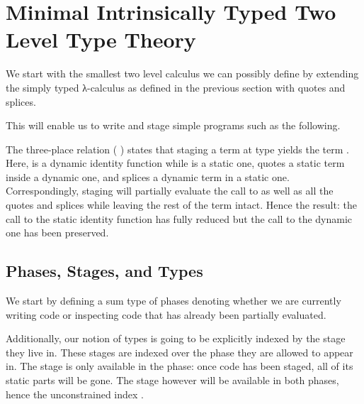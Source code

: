 \documentclass{article}
\begin{document}
\begin{AgdaSuppressSpace}
\end{AgdaSuppressSpace}

\section{Minimal Intrinsically Typed Two Level Type Theory}

We start with the smallest two level calculus we can possibly define
by extending the simply typed λ-calculus as defined in the previous
section with quotes and splices.

This will enable us to write and stage simple programs such as the following.


The three-place relation (    ) states
that staging a term  at type  yields the term .
%
Here,  is a dynamic identity function
while  is a static one,
 quotes a static term inside a dynamic one,
and  splices a dynamic term in a static one.
%
Correspondingly, staging will partially evaluate the call to
 as well as all the quotes and splices while leaving
the rest of the term intact.
%
Hence the result: the call to the static identity function has
fully reduced but the call to the dynamic one has been preserved.


\subsection{Phases, Stages, and Types}

We start by defining a sum type of phases denoting whether
we are currently writing  code or inspecting
 code that has already been partially evaluated.


Additionally, our notion of types is going to be explicitly
indexed by the stage they live in. These stages are indexed
over the phase they are allowed to appear in.
%
The  stage is only available in the 
phase: once code has been staged, all of its static parts will
be gone.
%
The  stage however will be available in both
phases, hence the unconstrained index .

\end{document}
